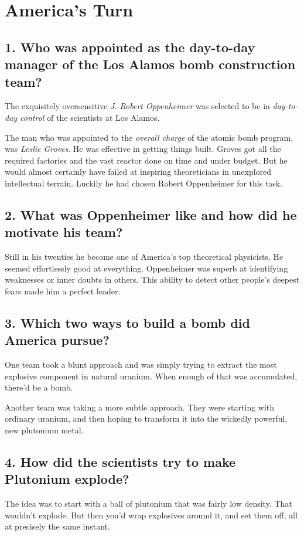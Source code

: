 %
\newpage
\section{America's Turn}

\subsection*{1. Who was appointed as the day-to-day manager of the Los Alamos bomb construction team?}
The exquisitely oversensitive \emph{J. Robert Oppenheimer} was selected to be in \emph{day-to-day control} of the scientists at Los Alamos.

The man who was appointed to the \emph{overall charge} of the atomic bomb program, was \emph{Leslie Groves}. He was effective in getting things built. Groves got all the required factories and the vast reactor done on time and under budget. But he would almost certainly have failed at inspiring theoreticians in unexplored intellectual terrain. Luckily he had chosen Robert Oppenheimer for this task.

\subsection*{2. What was Oppenheimer like and how did he motivate his team?}
Still in his twenties he become one of America's top theoretical physicists. He seemed effortlessly good at everything. Oppenheimer was superb at identifying weaknesses or inner doubts in others. This ability to detect other people's deepest fears made him a perfect leader.

\subsection*{3. Which two ways to build a bomb did America pursue?}
One team took a blunt approach and was simply trying to extract the most explosive component in natural uranium. When enough of that was accumulated, there'd be a bomb.

Another team was taking a more subtle approach. They were starting with ordinary uranium, and then hoping to transform it into the wickedly powerful, new plutonium metal.

\subsection*{4. How did the scientists try to make Plutonium explode?}
The idea was to start with a ball of plutonium that was fairly low density. That wouldn't explode. But then you'd wrap explosives around it, and set them off, all at precisely the same instant.

